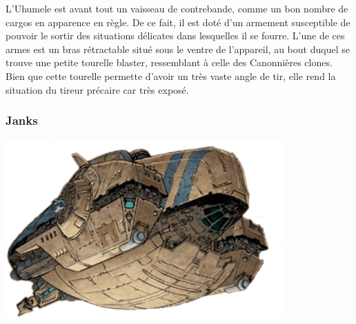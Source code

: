 L’Uhumele est avant tout un vaisseau de contrebande, comme un bon nombre de cargos en apparence en règle. De ce fait, il est doté d’un armement susceptible de pouvoir le sortir des situations délicates dans lesquelles il se fourre. L’une de ces armes est un bras rétractable situé sous le ventre de l’appareil, au bout duquel se trouve une petite tourelle blaster, ressemblant à celle des Canonnières clones. Bien que cette tourelle permette d’avoir un très vaste angle de tir, elle rend la situation du tireur précaire car très exposé. 

\subsubsection{Janks}\label{sec:uhumele-janks}
\hspace{12em}
\includegraphics[width=0.8\textwidth]{_img/songes-de-l-uhumele/uhumele.png}


